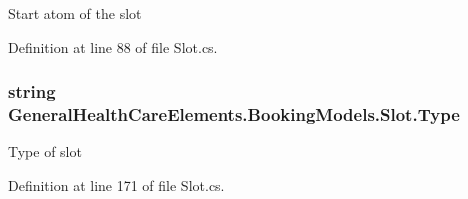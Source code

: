 Start atom of the slot 



Definition at line 88 of file Slot.\+cs.

\subsubsection[{\texorpdfstring{Type}{Type}}]{\setlength{\rightskip}{0pt plus 5cm}string General\+Health\+Care\+Elements.\+Booking\+Models.\+Slot.\+Type\hspace{0.3cm}{\ttfamily [get]}}\hypertarget{class_general_health_care_elements_1_1_booking_models_1_1_slot_a4976b94bf83515589d1bc49de9cb7b0c}{}\label{class_general_health_care_elements_1_1_booking_models_1_1_slot_a4976b94bf83515589d1bc49de9cb7b0c}


Type of slot 



Definition at line 171 of file Slot.\+cs.

